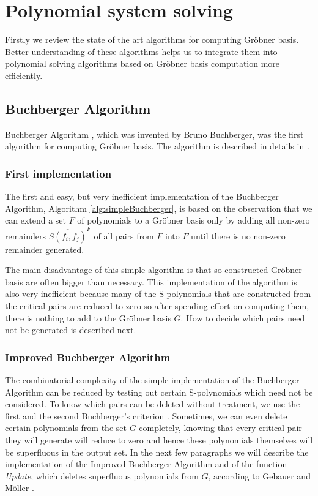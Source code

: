 \chapter{Polynomial system solving}
Firstly we review the state of the art algorithms for computing Gr\"obner basis. Better understanding of these algorithms helps us to integrate them into polynomial solving algorithms based on Gr\"obner basis computation more efficiently.

\section{Buchberger Algorithm}
Buchberger Algorithm \cite{Buchberger65}, which was invented by Bruno Buchberger, was the first algorithm for computing Gr\"obner basis. The algorithm is described in details in \cite{Becker93, Cox-Little-Shea97}.

\subsection{First implementation}
The first and easy, but very inefficient implementation of the Buchberger Algorithm, Algorithm \ref{alg:simpleBuchberger}, is based on the observation that we can extend a set $F$ of polynomials to a Gr\"obner basis only by adding all non-zero remainders $\overline{S(f_i, f_j)}^F$ of all pairs from $F$ into $F$ until there is no non-zero remainder generated.

The main disadvantage of this simple algorithm is that so constructed Gr\"obner basis are often bigger than necessary. This implementation of the algorithm is also very inefficient because many of the S-polynomials that are constructed from the critical pairs are reduced to zero so after spending effort on computing them, there is nothing to add to the Gr\"obner basis $G$. How to decide which pairs need not be generated is described next.



\subsection{Improved Buchberger Algorithm}
\label{subsec:ImprovedBuchberger}
The combinatorial complexity of the simple implementation of the Buchberger Algorithm can be reduced by testing out certain S-polynomials which need not be considered. To know which pairs can be deleted without treatment, we use the first and the second Buchberger's criterion \cite{Becker93}. Sometimes, we can even delete certain polynomials from the set $G$ completely, knowing that every critical pair they will generate will reduce to zero and hence these polynomials themselves will be superfluous in the output set. In the next few paragraphs we will describe the implementation of the Improved Buchberger Algorithm and of the function \textit{Update}, which deletes superfluous polynomials from $G$, according to Gebauer and M\"oller \cite{Gebauer-Moller88}.

